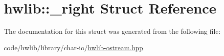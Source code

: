\hypertarget{structhwlib_1_1__right}{}\section{hwlib\+:\+:\+\_\+right Struct Reference}
\label{structhwlib_1_1__right}


The documentation for this struct was generated from the following file\+:\begin{DoxyCompactItemize}
\item 
code/hwlib/library/char-\/io/\hyperlink{hwlib-ostream_8hpp}{hwlib-\/ostream.\+hpp}\end{DoxyCompactItemize}
